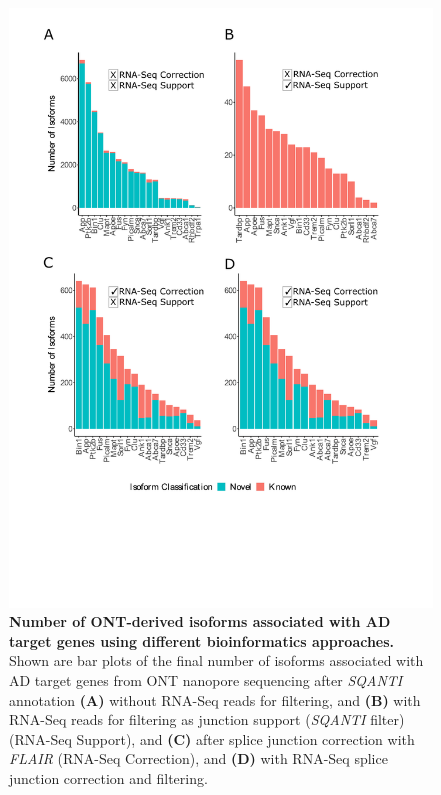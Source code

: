 \begin{figure}[ht]
	\centering
	\includegraphics[page=1,trim={0cm 4cm 0cm 0cm},clip,scale = 0.8]{Figures/ONTTargetedTranscriptome_BioinformaticsPipeline}
	\captionsetup{width=0.95\textwidth,singlelinecheck=off}
	\caption[Number of ONT-derived isoforms associated with AD target genes using different bioinformatics approaches]%
	{\textbf{Number of ONT-derived isoforms associated with AD target genes using different bioinformatics approaches.} Shown are bar plots of the final number of isoforms associated with AD target genes from ONT nanopore sequencing after \textit{SQANTI} annotation \textbf{(A)} without RNA-Seq reads for filtering, and \textbf{(B)} with RNA-Seq reads for filtering as junction support (\textit{SQANTI} filter) (RNA-Seq Support), and \textbf{(C)} after splice junction correction with \textit{FLAIR} (RNA-Seq Correction), and \textbf{(D)} with RNA-Seq splice junction correction and filtering.   
	}
	\label{fig:ONT_bioinformatics}
\end{figure}

